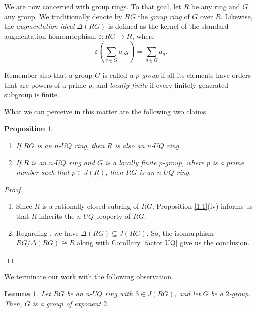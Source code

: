 \documentclass[12pt]{amsart}
\newtheorem{proposition}[theorem]{Proposition}
\newtheorem{lemma}[theorem]{Lemma}
\theoremstyle{definition}
\begin{document}
We are now concerned with group rings. To that goal, let $R$ be any ring and $G$ any group. We traditionally denote by $RG$ the {\it group ring} of $G$ over $R$. Likewise, the {\it augmentation ideal} $\Delta(RG)$ is defined as the kernel of the standard augmentation homomorphism $\varepsilon: RG\to R$, where $$\varepsilon\left(\sum_{g\in G}a_g g\right) = \sum_{g\in G}a_g.$$

Remember also that a group $G$ is called a {\it $p$-group} if all its elements have orders that are powers of a prime $p$, and {\it locally finite} if every finitely generated subgroup is finite.

\medskip

What we can perceive in this matter are the following two claims.

\begin{proposition}
\begin{enumerate}
\item
If $RG$ is an $n$-$UQ$ ring, then $R$ is also an $n$-$UQ$ ring.
\item	
If $R$ is an $n$-$UQ$ ring and $G$ is a locally finite $p$-group, where $p$ is a prime number such that $p \in J(R)$, then $RG$ is an $n$-$UQ$ ring.
\end{enumerate}
\end{proposition}

\begin{proof}
\begin{enumerate}
\item	
Since $R$ is a rationally closed subring of $RG$, Proposition \ref{1.1}(iv) informs us that $R$ inherits the $n$-$UQ$ property of $RG$.
\item	
Regarding \cite[Lemma 2]{26}, we have $\Delta(RG) \subseteq J(RG)$. So, the isomorphism $RG/\Delta(RG) \cong R$ along with Corollary \ref{factor UQ} give us the conclusion.
\end{enumerate}
\end{proof}

We terminate our work with the following observation.

\begin{lemma}
Let $RG$ be an n-$UQ$ ring with $3 \in J(RG)$, and let $G$ be a $2$-group. Then, $G$ is a group of exponent $2$.
\end{lemma}
\end{document}
